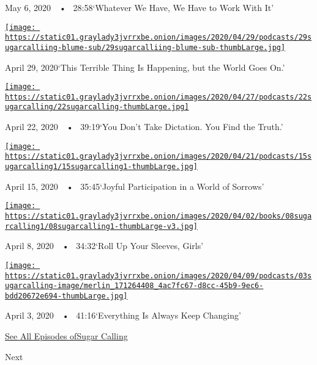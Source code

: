 May 6, 2020~~•~ 28:58`Whatever We Have, We Have to Work With It'

\href{https://www.nytimes3xbfgragh.onion/2020/04/29/podcasts/sugar-calling-judy-blume-quarantine-virus.html?action=click\&module=audio-series-bar\&region=header\&pgtype=Article}{\texttt{[image: https://static01.graylady3jvrrxbe.onion/images/2020/04/29/podcasts/29sugarcalliing-blume-sub/29sugarcalliing-blume-sub-thumbLarge.jpg]}}

April 29, 2020`This Terrible Thing Is Happening, but the World Goes On.'

\href{https://www.nytimes3xbfgragh.onion/2020/04/22/podcasts/sugar-calling-amy-tan-quarantine-virus.html?action=click\&module=audio-series-bar\&region=header\&pgtype=Article}{\texttt{[image: https://static01.graylady3jvrrxbe.onion/images/2020/04/27/podcasts/22sugarcalling/22sugarcalling-thumbLarge.jpg]}}

April 22, 2020~~•~ 39:19`You Don't Take Dictation. You Find the Truth.'

\href{https://www.nytimes3xbfgragh.onion/2020/04/15/podcasts/sugar-calling-pico-iyer-coronavirus.html?action=click\&module=audio-series-bar\&region=header\&pgtype=Article}{\texttt{[image: https://static01.graylady3jvrrxbe.onion/images/2020/04/21/podcasts/15sugarcalling1/15sugarcalling1-thumbLarge.jpg]}}

April 15, 2020~~•~ 35:45`Joyful Participation in a World of Sorrows'

\href{https://www.nytimes3xbfgragh.onion/2020/04/08/podcasts/sugar-calling-margaret-atwood-coronavirus.html?action=click\&module=audio-series-bar\&region=header\&pgtype=Article}{\texttt{[image: https://static01.graylady3jvrrxbe.onion/images/2020/04/02/books/08sugarcalling1/08sugarcalling1-thumbLarge-v3.jpg]}}

April 8, 2020~~•~ 34:32`Roll Up Your Sleeves, Girls'

\href{https://www.nytimes3xbfgragh.onion/2020/04/03/podcasts/sugar-calling-george-saunders-coronavirus.html?action=click\&module=audio-series-bar\&region=header\&pgtype=Article}{\texttt{[image: https://static01.graylady3jvrrxbe.onion/images/2020/04/09/podcasts/03sugarcalling-image/merlin\_171264408\_4ac7fc67-d8cc-45b9-9ec6-bdd20672e694-thumbLarge.jpg]}}

April 3, 2020~~•~ 41:16`Everything Is Always Keep Changing'

\href{https://www.nytimes3xbfgragh.onion/column/sugar-calling}{See All
Episodes ofSugar Calling}

Next


